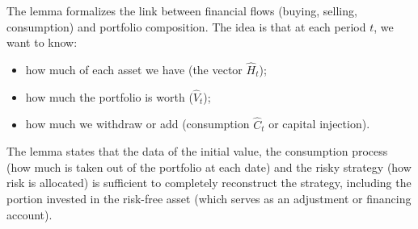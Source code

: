 \begin{remark}
The lemma formalizes the link between financial flows (buying, selling, consumption) and portfolio composition.
The idea is that at each period $t$, we want to know:
\begin{itemize}
    \item how much of each asset we have (the vector $\hat H_t$);
    \item how much the portfolio is worth ($\hat V_t$);
    \item how much we withdraw or add (consumption $\hat C_t$ or capital injection).
\end{itemize}
The lemma states that the data of the initial value, the consumption process (how much is taken out of the portfolio at each date) and the risky strategy (how risk is allocated) is sufficient to completely reconstruct the strategy, including the portion invested in the risk-free asset (which serves as an adjustment or financing account).
\end{remark}


